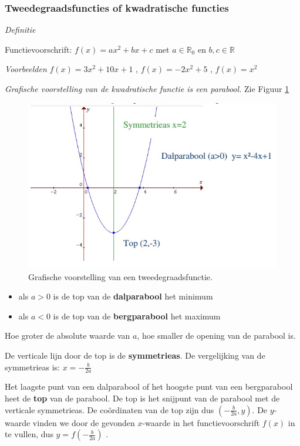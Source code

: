 \subsubsection{Tweedegraadsfuncties of kwadratische functies}


\emph{Definitie}

Functievoorschrift: $f(x)=ax^{2}+bx+c$ met $a\in\mathbb{R}_{0}$
en $b,c\in\mathbb{R}$ 

\emph{Voorbeelden}
$f(x)=3x^{2}+10x+1$ , $f(x)=-2x^{2}+5$
, $f(x)=x^{2}$

\emph{Grafische voorstelling van de kwadratische functie
is een parabool.}
Zie Figuur \ref{fig:tweede}
\begin{figure}[h]
\centering{}\includegraphics[width=.7\linewidth]{2_elem_rekenvaardigheden_B/inputs/tweedegraadsfuncties1.jpg}
\caption{Grafische voorstelling van een tweedegraadsfunctie.}
\label{fig:tweede} 
\end{figure}

\begin{itemize}
\item \noindent als $a>0$ is de top van de \textbf{dalparabool} het minimum
\item \noindent als $a<0$ is de top van de \textbf{bergparabool} het maximum
\end{itemize}
\noindent Hoe groter de absolute waarde van $a$, hoe smaller de opening
van de parabool is.

De verticale lijn door de top is de \textbf{symmetrieas}.
De vergelijking van de symmetrieas is: $x=-\frac{b}{2a}$ 

Het laagste punt van een dalparabool of het hoogste punt
van een bergparabool heet de \textbf{top} van de parabool. De top
is het snijpunt van de parabool met de verticale symmetrieas. De co\"ordinaten
van de top zijn dus $(-\frac{b}{2a},y)$. De $y$-waarde vinden we
door de gevonden $x$-waarde in het functievoorschrift $f(x)$ in
te vullen, dus $y=f(-\frac{b}{2a})$ .


